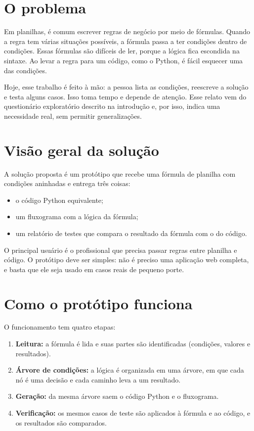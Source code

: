 \section{O problema}

Em planilhas, é comum escrever regras de negócio por meio de fórmulas. Quando a regra tem várias situações possíveis, a fórmula passa a ter condições dentro de condições. Essas fórmulas são difíceis de ler, porque a lógica fica escondida na sintaxe. Ao levar a regra para um código, como o Python, é fácil esquecer uma das condições.

Hoje, esse trabalho é feito à mão: a pessoa lista as condições, reescreve a solução e testa alguns casos. Isso toma tempo e depende de atenção. Esse relato vem do questionário exploratório descrito na introdução e, por isso, indica uma necessidade real, sem permitir generalizações.

\section{Visão geral da solução}

A solução proposta é um protótipo que recebe uma fórmula de planilha com condições aninhadas e entrega três coisas:

\begin{itemize}
    \item o código Python equivalente;
    \item um fluxograma com a lógica da fórmula;
    \item um relatório de testes que compara o resultado da fórmula com o do código.
\end{itemize}

O principal usuário é o profissional que precisa passar regras entre planilha e código. O protótipo deve ser simples: não é preciso uma aplicação web completa, e basta que ele seja usado em casos reais de pequeno porte.

\section{Como o protótipo funciona}

O funcionamento tem quatro etapas:

\begin{enumerate}
    \item \textbf{Leitura:} a fórmula é lida e suas partes são identificadas (condições, valores e resultados).
    \item \textbf{Árvore de condições:} a lógica é organizada em uma árvore, em que cada nó é uma decisão e cada caminho leva a um resultado.
    \item \textbf{Geração:} da mesma árvore saem o código Python e o fluxograma.
    \item \textbf{Verificação:} os mesmos casos de teste são aplicados à fórmula e ao código, e os resultados são comparados.
\end{enumerate}

